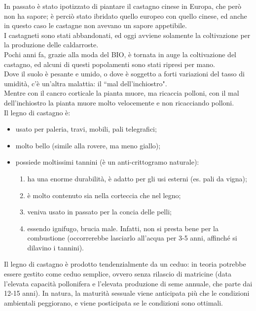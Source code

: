 In passato è stato ipotizzato di piantare il castagno cinese in Europa, che però non ha sapore; è perciò stato ibridato quello europeo con quello cinese, ed anche in questo caso le castagne non avevano un sapore appetibile.\\
I castagneti sono stati abbandonati, ed oggi avviene solamente la coltivazione per la produzione delle caldarroste.\\
Pochi anni fa, grazie alla moda del BIO, è tornata in auge la coltivazione del castagno, ed alcuni di questi popolamenti sono stati ripresi per mano.\\
Dove il suolo è pesante e umido, o dove è soggetto a forti variazioni del tasso di umidità, c'è un'altra malattia: il ``mal dell'inchiostro".\\
Mentre con il cancro corticale la pianta muore, ma ricaccia polloni, con il mal dell'inchiostro la pianta muore molto velocemente e non ricacciando polloni.\\
Il legno di castagno è:
\begin{itemize}[nosep]
    \item usato per paleria, travi, mobili, pali telegrafici;
    \item molto bello (simile alla rovere, ma meno giallo);
    \item possiede moltissimi tannini (è un anti-crittogramo naturale):
        \begin{enumerate}[nosep]
            \item ha una enorme durabilità, è adatto per gli usi esterni (es. pali da vigna);
            \item è molto contenuto sia nella corteccia che nel legno;
            \item veniva usato in passato per la concia delle pelli;
            \item essendo ignifugo, brucia male. Infatti, non si presta bene per la combustione (occorrerebbe lasciarlo all'acqua per 3-5 anni, affinché si dilavino i tannini).
        \end{enumerate}
\end{itemize}
Il legno di castagno è prodotto tendenzialmente da un ceduo: in teoria potrebbe essere gestito come ceduo semplice, ovvero senza rilascio di matricine (data l'elevata capacità pollonifera e l'elevata produzione di seme annuale, che parte dai 12-15 anni). In natura, la maturità sessuale viene anticipata più che le condizioni ambientali peggiorano, e viene posticipata se le condizioni sono ottimali.\\
